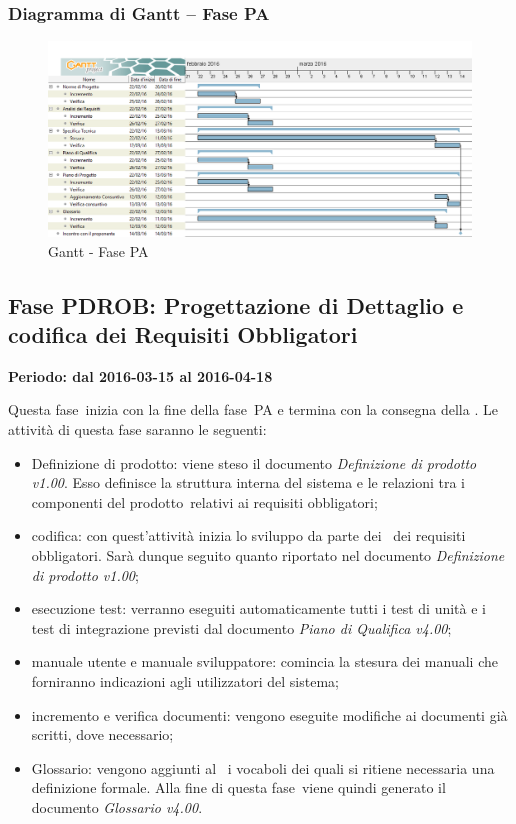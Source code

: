 \documentclass[../PianoProgetto.tex]{subfiles}
\begin{document}
		\subsubsection{Diagramma di Gantt – Fase PA}
			\begin{figure}[!h]
				\centering
				\includegraphics[width=\textwidth]{gantt_png/3-progettazione_architetturale}
				\caption{Gantt - Fase PA}
				\label{fig:Gantt - Fase PA}
			\end{figure}
			
	\subsection{Fase PDROB: Progettazione di Dettaglio e codifica dei Requisiti Obbligatori}
		\textbf{Periodo: dal 2016-03-15 al 2016-04-18}
		
		Questa fase\g\ inizia con la fine della fase\g\ PA e termina con la consegna della \revisionediprogettazione . Le attività di questa fase saranno le seguenti:
		\begin{itemize}
			\item Definizione di prodotto: viene steso il documento \textit{Definizione di prodotto v1.00}. Esso definisce la struttura interna del sistema e le relazioni tra i componenti del prodotto\g\ relativi ai requisiti obbligatori;

			\item codifica: con quest'attività inizia lo sviluppo da parte dei \programmatori\ dei requisiti obbligatori. Sarà dunque seguito quanto riportato nel documento \textit{Definizione di prodotto v1.00};

			\item esecuzione test: verranno eseguiti automaticamente tutti i test di unità e i test di integrazione previsti dal documento \textit{Piano di Qualifica v4.00};

			\item manuale utente e manuale sviluppatore: comincia la stesura dei manuali che forniranno indicazioni agli utilizzatori del sistema;

			\item incremento e verifica documenti: vengono eseguite modifiche ai documenti già scritti, dove necessario;

			\item Glossario: vengono aggiunti al \glossario\ i vocaboli dei quali si ritiene necessaria una definizione formale. Alla fine di questa fase\g\ viene quindi generato il documento \textit{Glossario v4.00}.
		\end{itemize}
\end{document}
